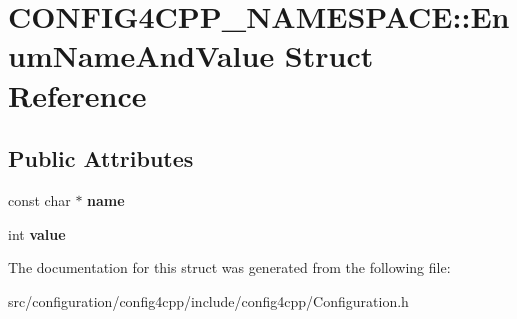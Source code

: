 \hypertarget{structCONFIG4CPP__NAMESPACE_1_1EnumNameAndValue}{\section{C\-O\-N\-F\-I\-G4\-C\-P\-P\-\_\-\-N\-A\-M\-E\-S\-P\-A\-C\-E\-:\-:Enum\-Name\-And\-Value Struct Reference}
\label{structCONFIG4CPP__NAMESPACE_1_1EnumNameAndValue}
}
\subsection*{Public Attributes}
\begin{DoxyCompactItemize}
\item 
\hypertarget{structCONFIG4CPP__NAMESPACE_1_1EnumNameAndValue_ab0b063367b99272bd3f89ec9f6a4fb3a}{const char $\ast$ {\bfseries name}}\label{structCONFIG4CPP__NAMESPACE_1_1EnumNameAndValue_ab0b063367b99272bd3f89ec9f6a4fb3a}

\item 
\hypertarget{structCONFIG4CPP__NAMESPACE_1_1EnumNameAndValue_a57c91cbbf43ccbe27898c9d7755875aa}{int {\bfseries value}}\label{structCONFIG4CPP__NAMESPACE_1_1EnumNameAndValue_a57c91cbbf43ccbe27898c9d7755875aa}

\end{DoxyCompactItemize}


The documentation for this struct was generated from the following file\-:\begin{DoxyCompactItemize}
\item 
src/configuration/config4cpp/include/config4cpp/Configuration.\-h\end{DoxyCompactItemize}
